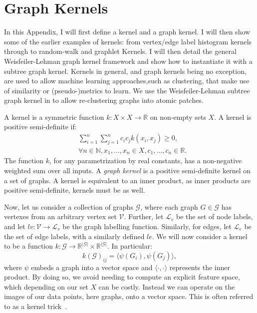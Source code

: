 \chapter{Graph Kernels}
\label{appendix:graph_kernels}

In this Appendix, I will first define a kernel and a graph kernel. I will then
show some of the earlier examples of kernels: from vertex/edge label histogram
kernels through to random-walk and graphlet Kernels. I will then detail the
general Weisfeiler-Lehman graph kernel framework and show how to instantiate it
with a subtree graph kernel. Kernels in general, and graph kernels being no
exception, are used to allow machine learning approaches,such as clustering,
that make use of similarity or (pseudo-)metrics to learn. We use the
Weisfeiler-Lehman subtree graph kernel in  to allow
re-clustering \deltaPDGN graphs into atomic patches.

A kernel is a symmetric function $k: X \times X \rightarrow \mathbb{R}$ on
non-empty sets $X$. A kernel is positive semi-definite if:
\begin{align*}
	&\sum_{i=1}^{n} \sum_{j=1}^{n} c_i c_j k(x_i, x_j) \geq 0, \\
	&\forall n \in \mathbb{N}, x_1, \ldots, x_n \in X, c_1, \ldots, c_n \in \mathbb{R}. 
\end{align*}
The function $k$, for any
parametrization by real constants, has a non-negative weighted sum over all
inputs. A \emph{graph kernel} is a positive semi-definite kernel on a set of
graphs. A kernel is equivalent to an inner product, as inner products are
positive semi-definite, kernels must be as well.

Now, let us consider a collection of graphs $\mathcal{G}$, where each graph $G
\in \mathcal{G}$ has vertexes from an arbitrary vertex set $\mathcal{V}$.
Further, let $\mathcal{L}_v$ be the set of node labels, and let $lv:
\mathcal{V} \rightarrow \mathcal{L}_v$ be the graph labelling function.
Similarly, for edges, let $\mathcal{L}_e$ be the set of edge labels, with a
similarly defined $le$. We will now consider a kernel to be a function
$k: \mathcal{G} \rightarrow \mathbb{R}^{|\mathcal{G}|} \times
\mathbb{R}^{|\mathcal{G}|}$. In particular:
\begin{equation}
\label{eq:kernel_general}
    k(\mathcal{G})_{ij} = \langle\psi(G_i), \psi(G_j)\rangle,
\end{equation}
%
where $\psi$ embeds a graph into a vector space and $\langle\cdot,\cdot\rangle$
represents the inner product. By doing so, we avoid needing to compute an
explicit feature space, which depending on our set $X$ can be costly. Instead we
can operate on the images of our data points, here graphs, onto a vector space.
This is often referred to as a kernel trick~\cite{theodoridis2008}.

